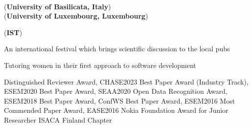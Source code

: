 \documentclass[9pt]{article}
\begin{document}
\newline{} \\ {(\textbf{University of Basilicata, Italy})} 
\medskip
\newline{} \\ {(\textbf{University of Luxembourg, Luxembourg})} 
\bigskip

\newline{} {(\textbf{IST})} 
\bigskip

\bigskip
{}

 
\newline\noindent An international festival which brings scientific discussion to the local pubs\bigskip
\bigskip

 
\newline\noindent Tutoring women in their first approach to software development\bigskip
\bigskip

\noindent Distinguished Reviewer Award, CHASE2023 
\newline\noindent Best Paper Award (Industry Track), ESEM2020 
\newline\noindent Best Paper Award, SEAA2020 
\newline\noindent Open Data Recognition Award, ESEM2018 
\newline\noindent Best Paper Award, ConfWS 
\newline\noindent Best Paper Award, ESEM2016 
\newline\noindent Most Commended Paper Award, EASE2016 
\newline\noindent Nokia Foundation Award for Junior Researcher 
\newline\noindent ISACA Finland Chapter
\bigskip


{}
\end{document}
